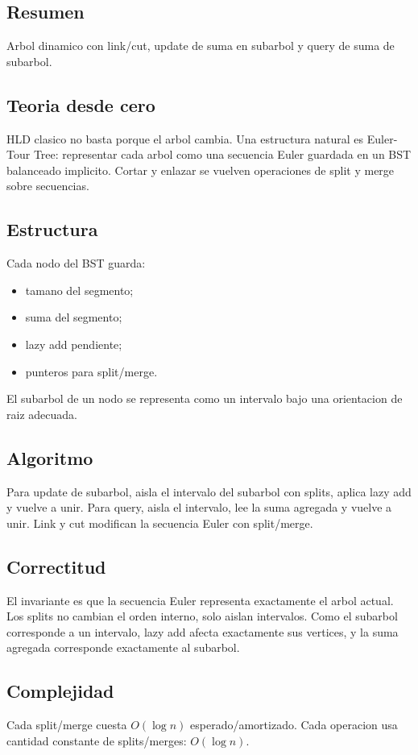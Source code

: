 \documentclass[10pt]{article}
\newcommand{\bigO}{O}
\begin{document}
\subsection*{Resumen}
Arbol dinamico con link/cut, update de suma en subarbol y query de suma de
subarbol.

\subsection*{Teoria desde cero}
HLD clasico no basta porque el arbol cambia. Una estructura natural es
Euler-Tour Tree: representar cada arbol como una secuencia Euler guardada en un
BST balanceado implicito. Cortar y enlazar se vuelven operaciones de split y
merge sobre secuencias.

\subsection*{Estructura}
Cada nodo del BST guarda:
\begin{itemize}[leftmargin=*]
\item tamano del segmento;
\item suma del segmento;
\item lazy add pendiente;
\item punteros para split/merge.
\end{itemize}
El subarbol de un nodo se representa como un intervalo bajo una orientacion de
raiz adecuada.

\subsection*{Algoritmo}
Para update de subarbol, aisla el intervalo del subarbol con splits, aplica lazy
add y vuelve a unir. Para query, aisla el intervalo, lee la suma agregada y
vuelve a unir. Link y cut modifican la secuencia Euler con split/merge.

\subsection*{Correctitud}
El invariante es que la secuencia Euler representa exactamente el arbol actual.
Los splits no cambian el orden interno, solo aislan intervalos. Como el subarbol
corresponde a un intervalo, lazy add afecta exactamente sus vertices, y la suma
agregada corresponde exactamente al subarbol.

\subsection*{Complejidad}
Cada split/merge cuesta $\bigO(\log n)$ esperado/amortizado. Cada operacion usa
cantidad constante de splits/merges: $\bigO(\log n)$.
\end{document}
